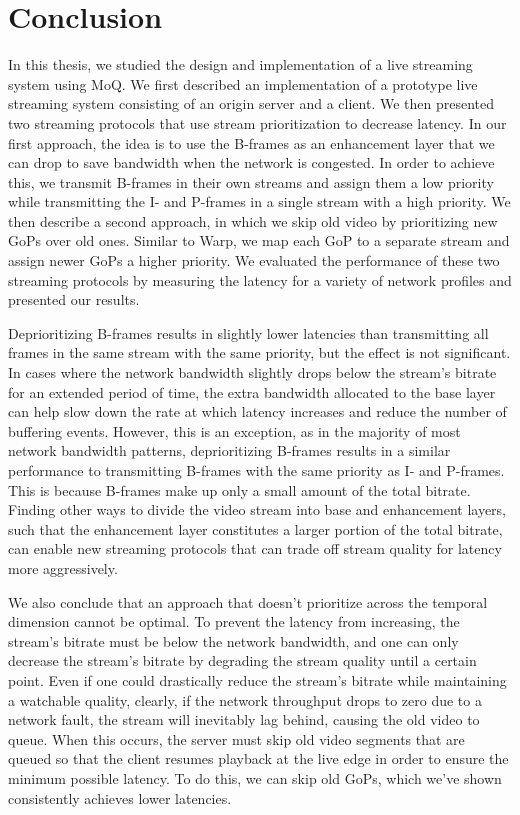 
\chapter{Conclusion}\label{chapter:conclusion}
In this thesis, we studied the design and implementation of a live streaming system using \ac{MoQ}. We first described an implementation of a prototype live streaming system consisting of an origin server and a client. We then presented two streaming protocols that use stream prioritization to decrease latency. In our first approach, the idea is to use the B-frames as an enhancement layer that we can drop to save bandwidth when the network is congested. In order to achieve this, we transmit B-frames in their own streams and assign them a low priority while transmitting the I- and P-frames in a single stream with a high priority. We then describe a second approach, in which we skip old video by prioritizing new \acp{GoP} over old ones. Similar to Warp, we map each GoP to a separate stream and assign newer GoPs a higher priority. We evaluated the performance of these two streaming protocols by measuring the latency for a variety of network profiles and presented our results.

Deprioritizing B-frames results in slightly lower latencies than transmitting all frames in the same stream with the same priority, but the effect is not significant. In cases where the network bandwidth slightly drops below the stream's bitrate for an extended period of time, the extra bandwidth allocated to the base layer can help slow down the rate at which latency increases and reduce the number of buffering events. However, this is an exception, as in the majority of most network bandwidth patterns, deprioritizing B-frames results in a similar performance to transmitting B-frames with the same priority as I- and P-frames. This is because B-frames make up only a small amount of the total bitrate. Finding other ways to divide the video stream into base and enhancement layers, such that the enhancement layer constitutes a larger portion of the total bitrate, can enable new streaming protocols that can trade off stream quality for latency more aggressively.

We also conclude that an approach that doesn't prioritize across the temporal dimension cannot be optimal. To prevent the latency from increasing, the stream's bitrate must be below the network bandwidth, and one can only decrease the stream's bitrate by degrading the stream quality until a certain point. Even if one could drastically reduce the stream's bitrate while maintaining a watchable quality, clearly, if the network throughput drops to zero due to a network fault, the stream will inevitably lag behind, causing the old video to queue. When this occurs, the server must skip old video segments that are queued so that the client resumes playback at the live edge in order to ensure the minimum possible latency. To do this, we can skip old GoPs, which we've shown consistently achieves lower latencies.

